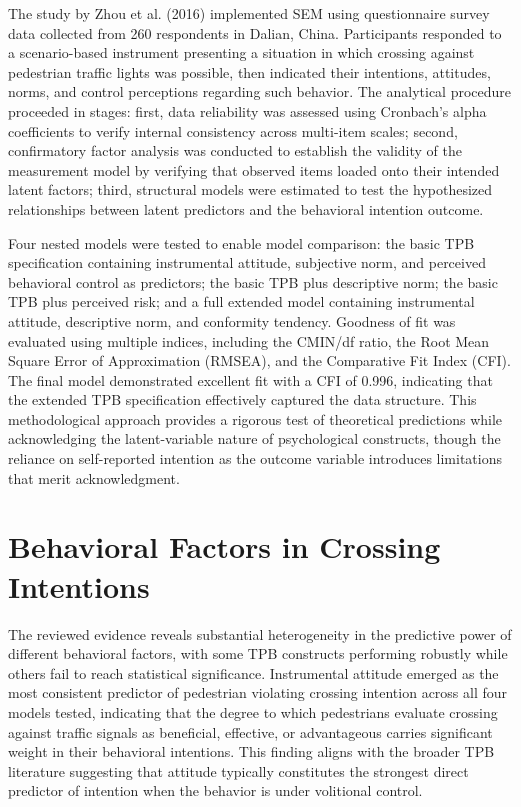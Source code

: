 \documentclass{article}
\begin{document}
The study by Zhou et al. (2016) implemented SEM using questionnaire survey data collected from 260 respondents in Dalian, China. Participants responded to a scenario-based instrument presenting a situation in which crossing against pedestrian traffic lights was possible, then indicated their intentions, attitudes, norms, and control perceptions regarding such behavior. The analytical procedure proceeded in stages: first, data reliability was assessed using Cronbach's alpha coefficients to verify internal consistency across multi-item scales; second, confirmatory factor analysis was conducted to establish the validity of the measurement model by verifying that observed items loaded onto their intended latent factors; third, structural models were estimated to test the hypothesized relationships between latent predictors and the behavioral intention outcome. \cite{08_2016_zhou_aap}

Four nested models were tested to enable model comparison: the basic TPB specification containing instrumental attitude, subjective norm, and perceived behavioral control as predictors; the basic TPB plus descriptive norm; the basic TPB plus perceived risk; and a full extended model containing instrumental attitude, descriptive norm, and conformity tendency. Goodness of fit was evaluated using multiple indices, including the CMIN/df ratio, the Root Mean Square Error of Approximation (RMSEA), and the Comparative Fit Index (CFI). The final model demonstrated excellent fit with a CFI of 0.996, indicating that the extended TPB specification effectively captured the data structure. This methodological approach provides a rigorous test of theoretical predictions while acknowledging the latent-variable nature of psychological constructs, though the reliance on self-reported intention as the outcome variable introduces limitations that merit acknowledgment. \cite{08_2016_zhou_aap}

\section{Behavioral Factors in Crossing Intentions}
The reviewed evidence reveals substantial heterogeneity in the predictive power of different behavioral factors, with some TPB constructs performing robustly while others fail to reach statistical significance. Instrumental attitude emerged as the most consistent predictor of pedestrian violating crossing intention across all four models tested, indicating that the degree to which pedestrians evaluate crossing against traffic signals as beneficial, effective, or advantageous carries significant weight in their behavioral intentions. This finding aligns with the broader TPB literature suggesting that attitude typically constitutes the strongest direct predictor of intention when the behavior is under volitional control. \cite{08_2016_zhou_aap}
\end{document}
